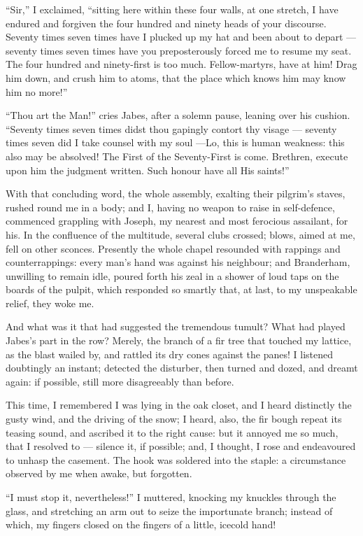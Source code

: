 \par “Sir,” I exclaimed, “sitting here within these four walls, at one stretch, I have endured and forgiven the four hundred and ninety heads of your discourse. Seventy times seven times have I plucked up my hat and been about to depart — seventy times seven times have you preposterously forced me to resume my seat. The four hundred and ninety-first is too much. Fellow-martyrs, have at him! Drag him down, and crush him to atoms, that the place which knows him may know him no more!”
\par “Thou art the Man!” cries Jabes, after a solemn pause, leaning over his cushion. “Seventy times seven times didst thou gapingly contort thy visage — seventy times seven did I take counsel with my soul —Lo, this is human weakness: this also may be absolved! The First of the Seventy-First is come. Brethren, execute upon him the judgment written. Such honour have all His saints!”
\par With that concluding word, the whole assembly, exalting their pilgrim's staves, rushed round me in a body; and I, having no weapon to raise in self-defence, commenced grappling with Joseph, my nearest and most ferocious assailant, for his. In the confluence of the multitude, several clubs crossed; blows, aimed at me, fell on other sconces. Presently the whole chapel resounded with rappings and counterrappings: every man's hand was against his neighbour; and Branderham, unwilling to remain idle, poured forth his zeal in a shower of loud taps on the boards of the pulpit, which responded so smartly that, at last, to my unspeakable relief, they woke me.
\par And what was it that had suggested the tremendous tumult? What had played Jabes's part in the row? Merely, the branch of a fir tree that touched my lattice, as the blast wailed by, and rattled its dry cones against the panes! I listened doubtingly an instant; detected the disturber, then turned and dozed, and dreamt again: if possible, still more disagreeably than before.
\par This time, I remembered I was lying in the oak closet, and I heard distinctly the gusty wind, and the driving of the snow; I heard, also, the fir bough repeat its teasing sound, and ascribed it to the right cause: but it annoyed me so much, that I resolved to — silence it, if possible; and, I thought, I rose and endeavoured to unhasp the casement. The hook was soldered into the staple: a circumstance observed by me when awake, but forgotten.
\par “I must stop it, nevertheless!” I muttered, knocking my knuckles through the glass, and stretching an arm out to seize the importunate branch; instead of which, my fingers closed on the fingers of a little, icecold hand!

